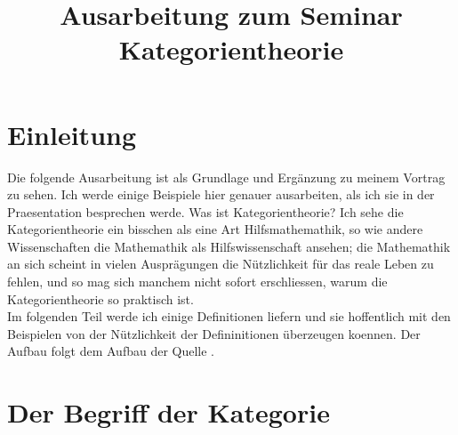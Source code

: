 \documentclass{article}
\title{Ausarbeitung zum Seminar Kategorientheorie}
\begin{document}
\section{Einleitung}
	Die folgende Ausarbeitung ist als Grundlage und Erg\"anzung zu meinem Vortrag zu sehen. 
	Ich werde einige Beispiele hier genauer ausarbeiten, als ich sie in der Praesentation besprechen werde.
	Was ist Kategorientheorie? 
	Ich sehe die Kategorientheorie ein bisschen als eine Art Hilfsmathemathik, so wie andere Wissenschaften die Mathemathik als Hilfswissenschaft ansehen;
	die Mathemathik an sich scheint in vielen Auspr\"agungen die N\"utzlichkeit f\"ur das reale Leben zu fehlen,
	und so mag sich manchem nicht sofort erschliessen, 
	warum die Kategorientheorie so praktisch ist.
	\\
	Im folgenden Teil werde ich einige Definitionen liefern und sie hoffentlich mit den Beispielen von der N\"utzlichkeit der Defininitionen \"uberzeugen koennen. Der Aufbau folgt dem Aufbau der Quelle \nocite{Bra}.
\section{Der Begriff der Kategorie}
	
\end{document}
